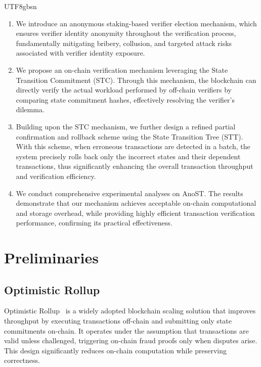 \documentclass[runningheads]{llncs}
\begin{document}
\begin{CJK*}{UTF8}{gbsn}
\begin{enumerate}
    \item We introduce an anonymous staking-based verifier election mechanism, which ensures verifier identity anonymity throughout the verification process, fundamentally mitigating bribery, collusion, and targeted attack risks associated with verifier identity exposure.

    \item We propose an on-chain verification mechanism leveraging the State Transition Commitment (STC). Through this mechanism, the blockchain can directly verify the actual workload performed by off-chain verifiers by comparing state commitment hashes, effectively resolving the verifier's dilemma.

    \item Building upon the STC mechanism, we further design a refined partial confirmation and rollback scheme using the State Transition Tree (STT). With this scheme, when erroneous transactions are detected in a batch, the system precisely rolls back only the incorrect states and their dependent transactions, thus significantly enhancing the overall transaction throughput and verification efficiency.

    \item We conduct comprehensive experimental analyses on AnoST. The results demonstrate that our mechanism achieves acceptable on-chain computational and storage overhead, while providing highly efficient transaction verification performance, confirming its practical effectiveness.
\end{enumerate}



\section{Preliminaries}

\subsection{Optimistic Rollup}

Optimistic Rollup~\cite{op-url} is a widely adopted blockchain scaling solution that improves throughput by executing transactions off-chain and submitting only state commitments on-chain. It operates under the assumption that transactions are valid unless challenged, triggering on-chain fraud proofs only when disputes arise. This design significantly reduces on-chain computation while preserving correctness.


\end{CJK*}
\end{document}

